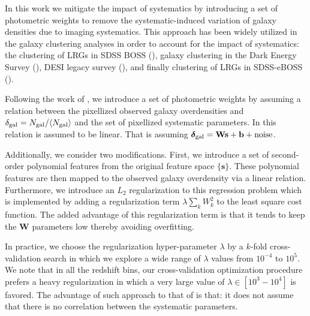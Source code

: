 \documentclass[fleqn,usenatbib,useAMS]{mnras}
\begin{document}

In this work we mitigate the impact of systematics by introducing a set of photometric weights to remove the systematic-induced variation of galaxy densities due to imaging systematics. This approach has been widely utilized in the galaxy clustering analyses in order to account for the impact of systematics: the clustering of LRGs in SDSS BOSS (\citealt{ross2012clustering, ross2017clustering}), galaxy clustering in the Dark Energy Survey (\citealt{elvin2017,crocce2019dark}), DESI legacy survey (\citealt{DESI_systematic}), and finally clustering of LRGs in SDSS-eBOSS (\citealt{bautista2018sdss, icaza2020clustering}). 

Following the work of \citet{bautista2018sdss}, we introduce a set of photometric weights by assuming a relation between the pixellized observed galaxy overdensities and $\delta_{\rm gal} = N_{\rm gal}/\langle N_{\rm gal}\rangle$ and the set of pixellized systematic parameters. In \citet{bautista2018sdss} this relation is assumed to be linear. That is assuming $\boldsymbol{\delta}_{\rm gal} = \mathbf{Ws+b} + \mathbf{\mathrm{noise}}$. 

Additionally, we consider two modifications. First, we introduce a set of second-order polynomial features from the original feature space $\{\mathbf{s}\}$. These polynomial features are then mapped to the observed galaxy overdensity via a linear relation. Furthermore, we introduce an $L_{2}$ regularization to this regression problem which is implemented by adding a regularization term $\lambda \sum_{k} W_k^2$ to the least square cost function. The added advantage of this regularization term is that it tends to keep the $\mathbf{W}$ parameters low thereby avoiding overfitting.

In practice, we choose the regularization hyper-parameter $\lambda$ by a $k$-fold cross-validation search in which we explore a wide range of $\lambda$ values from $10^{-4}$ to $10^{5}$. We note that in all the redshift bins, our cross-validation optimization procedure prefers a heavy regularization in which a very large value of $\lambda \in [10^3-10^4]$ is favored. The advantage of such approach to that of \citet{ross2017clustering} is that: it does not assume that there is no correlation between the systematic parameters.
\end{document}
